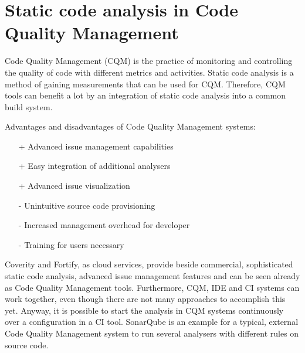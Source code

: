 \documentclass[conference]{IEEEtran}
\begin{document}
\section{Static code analysis in Code Quality Management}
\label{sec:static_code_analysis_code_quality_management}

Code Quality Management (CQM) is the practice of monitoring and controlling the quality of code with different metrics and activities.
Static code analysis is a method of gaining measurements that can be used for CQM. Therefore, CQM tools can benefit a lot by an integration of static code analysis into a common build system.


Advantages and disadvantages of Code Quality Management systems:
\begin{itemize}
	\item[+] Advanced issue management capabilities
	\item[+] Easy integration of additional analysers
	\item[+] Advanced issue visualization
	\item[-] Unintuitive source code provisioning
	\item[-] Increased management overhead for developer
	\item[-] Training for users necessary 
\end{itemize}

Coverity and Fortify, as cloud services, provide beside commercial, sophisticated static code analysis, advanced issue management features and can be seen already as Code Quality Management tools.
Furthermore, CQM, IDE and CI systems can work together, even though there are not many approaches to accomplish this yet. 
Anyway, it is possible to start the analysis in CQM systems continuously over a configuration in a CI tool.
SonarQube is an example for a typical, external Code Quality Management system to run several analysers with different rules on source code.
\end{document}
